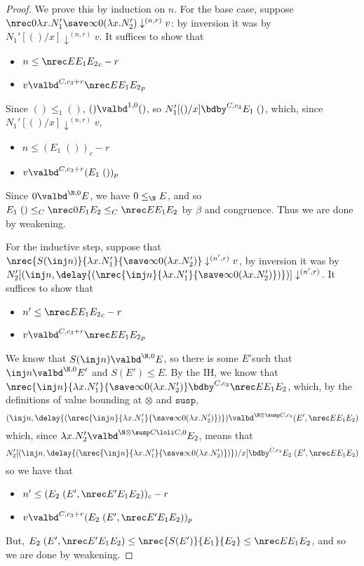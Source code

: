 \begin{proof}
We prove this by induction on $n$. For the base case, suppose $\nrec 0 {\lambda x.N_1'} {\save \infty 0 (\lambda x.N_2')} \downarrow^{(n,r)} v$: 
by inversion it was by $N_1'[()/x] \downarrow^{(n,r)} v$. It suffices to show that
\begin{itemize}
  \item $n \leq \nrec E {E_1} {E_2}_c - r$
  \item $v \valbd^{C,c_3 + r}  \nrec E {E_1} {E_2}_p$
\end{itemize}
Since $() \leq_1 ()$, $() \valbd^{1,0} ()$, so $N_1'[()/x] \bdby^{C,c_3} E_1 \; ()$, which, since $N_1'[()/x] \downarrow^{(n,r)} v$,
\begin{itemize}
  \item $n \leq (E_1 \; ())_c - r$
  \item $v \valbd^{C,c_3 + r} (E_1 \; ())_p$
\end{itemize}
Since $0 \valbd^{\N,0} E$, we have $0 \leq_\N E$, and so $E_1 \; () \leq_C \nrec 0 {E_1} {E_2} \leq_C \nrec E {E_1} {E_2}$ by $\beta$ and congruence. Thus we are done by weakening.

For the inductive step, suppose that $\nrec {S(\inj n)} {\lambda x.N_1'} {\save \infty 0 (\lambda x.N_2')} \downarrow^{(n',r)} v$, by inversion it was by $N_2'[(\inj n,\delay {(\nrec {\inj n} {\lambda x.N_1'} {\save \infty 0 (\lambda x.N_2')} )})] \downarrow^{(n',r)}$. It suffices to show that
\begin{itemize}
  \item $n' \leq \nrec E {E_1} {E_2}_c - r$
  \item $v \valbd^{C,c_3+r}  \nrec E {E_1} {E_2}_p$
\end{itemize}
We know that $S(\inj n) \valbd^{\N,0} E$, so there is some $E' $such that $\inj n \valbd^{\N,0} E'$ and $S(E') \leq E$. By the IH, we know that 
$\nrec {\inj n} {\lambda x.N_1'} {\save \infty 0 (\lambda x.N_2')} \bdby^{C,c_3} \nrec E {E_1} {E_2}$, which, by the definitions of value bounding at $\otimes$ and $\texttt{susp}$, 
$$
(\inj n,\delay {(\nrec {\inj n} {\lambda x.N_1'} {\save \infty 0 (\lambda x.N_2')} )}) \valbd^{\N \otimes \susp C,c_3} (E', \nrec E {E_1} {E_2})
$$
which, since $\lambda x.N_2' \valbd^{\N \otimes \susp C \loli C,0} E_2$, means that
$$
N_2'[(\inj n,\delay {(\nrec {\inj n} {\lambda x.N_1'} {\save \infty 0 (\lambda x.N_2')} )})/x] \bdby^{C,c_3} E_2 \; (E', \nrec E {E_1} {E_2})
$$
so we have that
\begin{itemize}
  \item $n' \leq (E_2 \; (E', \nrec E' {E_1} {E_2}))_c - r$
  \item $v \valbd^{C,c_3 + r} (E_2 \; (E', \nrec E' {E_1} {E_2}))_p$
\end{itemize}
But, $E_2 \; (E', \nrec E' {E_1} {E_2}) \leq \nrec {S(E')} {E_1} {E_2} \leq \nrec E {E_1} {E_2}$, and so we are done by weakening.
\end{proof}